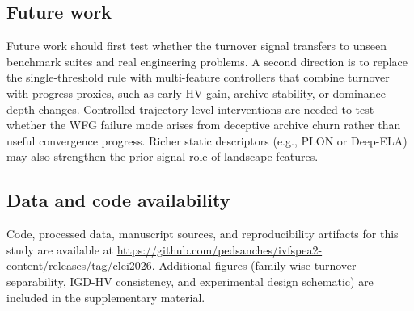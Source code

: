 \documentclass[conference]{IEEEtran}
\begin{document}
\subsection{Future work}
Future work should first test whether the turnover signal transfers to
unseen benchmark suites and real engineering problems. A second direction
is to replace the single-threshold rule with multi-feature controllers
that combine turnover with progress proxies, such as early HV gain,
archive stability, or dominance-depth changes. Controlled
trajectory-level interventions are needed to test whether the WFG failure
mode arises from deceptive archive churn rather than useful convergence
progress. Richer static descriptors (e.g., PLON or Deep-ELA) may also
strengthen the prior-signal role of landscape features.

\subsection{Data and code availability}
Code, processed data, manuscript sources, and reproducibility artifacts for
this study are available at
\url{https://github.com/pedsanches/ivfspea2-content/releases/tag/clei2026}.
Additional figures (family-wise turnover separability, IGD-HV consistency,
and experimental design schematic) are included in the supplementary
material.



\end{document}
